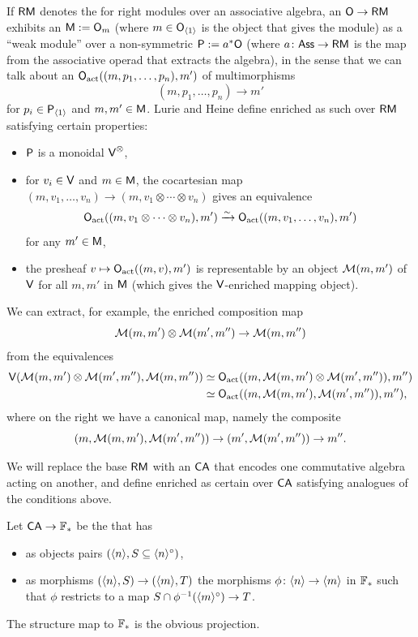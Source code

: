 \documentclass[a4paper,11pt]{article}
\begin{document}
If $\textup{\textsf{RM}}$ denotes the
\iopd{} for right modules over an associative algebra, an \iopd{}
$\oO \to \RM$ exhibits an \icat{} $\textup{\textsf{M}} := \textup{\textsf{O}}_{m}$ (where $m \in
\textup{\textsf{O}}_{\langle 1 \rangle}$ is the object that gives the module) as a ``weak module'' over a
non-symmetric \iopd{} $\textup{\textsf{P}} := a^{*}\textup{\textsf{O}}$ (where $a \colon
\catname{Ass}\to \RM$ is the map from
the associative operad that extracts the algebra), in the sense that we
can talk about an \igpd{} $\textup{\textsf{O}}_{\text{\textup{act}}}((m,p_{1},\dots,p_{n}),m')$ of
multimorphisms
\[ (m,p_{1},\dots,p_{n}) \to m'\]
for $p_{i} \in \textup{\textsf{P}}_{\langle 1 \rangle}$ and $m,m' \in \textup{\textsf{M}}$. Lurie and Heine define
enriched \icats{} as such \iopds{} over $\textup{\textsf{RM}}$ satisfying certain
properties:
\begin{itemize}
\item $\textup{\textsf{P}}$ is a monoidal \icat{} $\textup{\textsf{V}}^{\otimes}$,
\item for $v_{i} \in \textup{\textsf{V}}$ and $m \in \textup{\textsf{M}}$, the cocartesian map $(m,v_{1},\dots,v_{n}) \to (m,v_{1} \otimes \cdots \otimes v_{n})$ gives an equivalence
  \[ \oO_{\act}((m,v_{1} \otimes \cdots \otimes v_{n}),m') \isoto \oO_{\act}((m,v_{1},\dots,v_{n}),m')\]
  for any $m' \in \textup{\textsf{M}}$,
\item the presheaf $v \mapsto \textup{\textsf{O}}_{\text{\textup{act}}}((m,v),m')$ is representable
  by an object $\mathcal{M}(m,m')$ of $\textup{\textsf{V}}$ for all $m,m'$ in
  $\textup{\textsf{M}}$ (which gives the $\textup{\textsf{V}}$-enriched mapping object).
\end{itemize}
We can extract, for example, the enriched composition map
\[ \eM(m,m') \otimes \eM(m',m'') \to \eM(m,m'')\]
from the equivalences
\[
  \begin{split}
    \textup{\textsf{V}}(\mathcal{M}(m,m') \otimes \mathcal{M}(m',m''), \mathcal{M}(m,m'')) & \simeq
    \textup{\textsf{O}}_{\text{\textup{act}}}((m,\mathcal{M}(m,m') \otimes \mathcal{M}(m',m'')), m'') \\ & \simeq 
    \textup{\textsf{O}}_{\text{\textup{act}}}((m,\mathcal{M}(m,m'), \mathcal{M}(m',m'')), m''),
  \end{split}
\]
where on the right we have a canonical map, namely the composite
\[ (m, \eM(m,m'), \eM(m',m'')) \to (m', \eM(m',m'')) \to m''.\]

We will replace the base $\textup{\textsf{RM}}$ with an \iopd{} $\textup{\textsf{CA}}$ that encodes one
commutative algebra acting on another, and define
enriched \iopds{} as certain \iopds{} over $\textup{\textsf{CA}}$ satisfying analogues
of the conditions above.

\begin{defn}
  Let $\CA \to \xF_{*}$ be the \iopd{} that has
  \begin{itemize}
  \item as objects pairs $(\langle n \rangle, S \subseteq \langle n \rangle^{\circ})$,
  \item as morphisms $(\angled{n}, S) \to (\angled{m}, T)$ the
    morphisms $\phi \colon \angled{n} \to \angled{m}$ in $\mathbb{F}_{*}$
    such that $\phi$ restricts to a map
    $S \cap \phi^{-1}(\angled{m}^{\circ}) \to T$.
  \end{itemize}
  The structure map to $\mathbb{F}_{*}$ is the obvious projection.
\end{defn}
\end{document}
